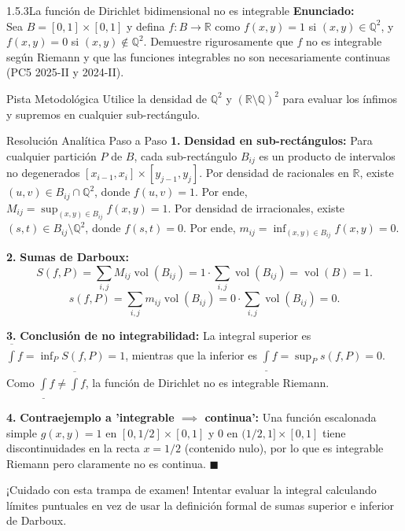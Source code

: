 \documentclass[11pt,a4paper]{article}
\begin{document}
\begin{nivelbox}{1.5.3}{La función de Dirichlet bidimensional no es integrable}
\textbf{Enunciado:}\\
Sea $B = [0,1] \times [0,1]$ y defina $f: B \to \mathbb{R}$ como $f(x,y) = 1$ si $(x,y) \in \mathbb{Q}^2$, y $f(x,y) = 0$ si $(x,y) \notin \mathbb{Q}^2$. Demuestre rigurosamente que $f$ no es integrable según Riemann y que las funciones integrables no son necesariamente continuas (PC5 2025-II y 2024-II).

\begin{observacionbox}{Pista Metodológica}
Utilice la densidad de $\mathbb{Q}^2$ y $(\mathbb{R} \setminus \mathbb{Q})^2$ para evaluar los ínfimos y supremos en cualquier sub-rectángulo.
\end{observacionbox}

\begin{ejerciciobox}{Resolución Analítica Paso a Paso}
\smallskip\noindent\textbf{1.} \textbf{Densidad en sub-rectángulos:}
Para cualquier partición $P$ de $B$, cada sub-rectángulo $B_{ij}$ es un producto de intervalos no degenerados $[x_{i-1}, x_i] \times [y_{j-1}, y_j]$.
Por densidad de racionales en $\mathbb{R}$, existe $(u,v) \in B_{ij} \cap \mathbb{Q}^2$, donde $f(u,v) = 1$. Por ende, $M_{ij} = \sup_{(x,y) \in B_{ij}} f(x,y) = 1$.
Por densidad de irracionales, existe $(s,t) \in B_{ij} \setminus \mathbb{Q}^2$, donde $f(s,t) = 0$. Por ende, $m_{ij} = \inf_{(x,y) \in B_{ij}} f(x,y) = 0$.

\smallskip\noindent\textbf{2.} \textbf{Sumas de Darboux:}
\[S(f, P) = \sum_{i,j} M_{ij} \operatorname{vol}(B_{ij}) = 1 \cdot \sum_{i,j} \operatorname{vol}(B_{ij}) = \operatorname{vol}(B) = 1.\]
\[s(f, P) = \sum_{i,j} m_{ij} \operatorname{vol}(B_{ij}) = 0 \cdot \sum_{i,j} \operatorname{vol}(B_{ij}) = 0.\]

\smallskip\noindent\textbf{3.} \textbf{Conclusión de no integrabilidad:}
La integral superior es $\overline{\int} f = \inf_P S(f, P) = 1$, mientras que la inferior es $\underline{\int} f = \sup_P s(f, P) = 0$.
Como $\underline{\int} f \neq \overline{\int} f$, la función de Dirichlet no es integrable Riemann.

\smallskip\noindent\textbf{4.} \textbf{Contraejemplo a 'integrable $\implies$ continua':}
Una función escalonada simple $g(x,y) = 1$ en $[0, 1/2] \times [0,1]$ y $0$ en $(1/2, 1] \times [0,1]$ tiene discontinuidades en la recta $x = 1/2$ (contenido nulo), por lo que es integrable Riemann pero claramente no es continua. $\blacksquare$
\end{ejerciciobox}

\begin{errorbox}{¡Cuidado con esta trampa de examen!}
Intentar evaluar la integral calculando límites puntuales en vez de usar la definición formal de sumas superior e inferior de Darboux.
\end{errorbox}
\end{nivelbox}
\bigskip
\end{document}
